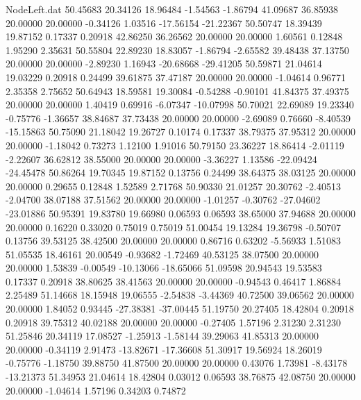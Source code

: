 \begin{filecontents}{NodeLeft.dat}
  50.45683   20.34126   18.96484    -1.54563   -1.86794   41.09687   36.85938   20.00000   20.00000   -0.34126    1.03516  -17.56154  -21.22367
  50.50747   18.39439   19.87152     0.17337    0.20918   42.86250   36.26562   20.00000   20.00000    1.60561    0.12848    1.95290    2.35631
  50.55804   22.89230   18.83057    -1.86794   -2.65582   39.48438   37.13750   20.00000   20.00000   -2.89230    1.16943  -20.68668  -29.41205
  50.59871   21.04614   19.03229     0.20918    0.24499   39.61875   37.47187   20.00000   20.00000   -1.04614    0.96771    2.35358    2.75652
  50.64943   18.59581   19.30084    -0.54288   -0.90101   41.84375   37.49375   20.00000   20.00000    1.40419    0.69916   -6.07347  -10.07998
  50.70021   22.69089   19.23340    -0.75776   -1.36657   38.84687   37.73438   20.00000   20.00000   -2.69089    0.76660   -8.40539  -15.15863
  50.75090   21.18042   19.26727     0.10174    0.17337   38.79375   37.95312   20.00000   20.00000   -1.18042    0.73273    1.12100    1.91016
  50.79150   23.36227   18.86414    -2.01119   -2.22607   36.62812   38.55000   20.00000   20.00000   -3.36227    1.13586  -22.09424  -24.45478
  50.86264   19.70345   19.87152     0.13756    0.24499   38.64375   38.03125   20.00000   20.00000    0.29655    0.12848    1.52589    2.71768
  50.90330   21.01257   20.30762    -2.40513   -2.04700   38.07188   37.51562   20.00000   20.00000   -1.01257   -0.30762  -27.04602  -23.01886
  50.95391   19.83780   19.66980     0.06593    0.06593   38.65000   37.94688   20.00000   20.00000    0.16220    0.33020    0.75019    0.75019
  51.00454   19.13284   19.36798    -0.50707    0.13756   39.53125   38.42500   20.00000   20.00000    0.86716    0.63202   -5.56933    1.51083
  51.05535   18.46161   20.00549    -0.93682   -1.72469   40.53125   38.07500   20.00000   20.00000    1.53839   -0.00549  -10.13066  -18.65066
  51.09598   20.94543   19.53583     0.17337    0.20918   38.80625   38.41563   20.00000   20.00000   -0.94543    0.46417    1.86884    2.25489
  51.14668   18.15948   19.06555    -2.54838   -3.44369   40.72500   39.06562   20.00000   20.00000    1.84052    0.93445  -27.38381  -37.00445
  51.19750   20.27405   18.42804     0.20918    0.20918   39.75312   40.02188   20.00000   20.00000   -0.27405    1.57196    2.31230    2.31230
  51.25846   20.34119   17.08527    -1.25913   -1.58144   39.29063   41.85313   20.00000   20.00000   -0.34119    2.91473  -13.82671  -17.36608
  51.30917   19.56924   18.26019    -0.75776   -1.18750   39.88750   41.87500   20.00000   20.00000    0.43076    1.73981   -8.43178  -13.21373
  51.34953   21.04614   18.42804     0.03012    0.06593   38.76875   42.08750   20.00000   20.00000   -1.04614    1.57196    0.34203    0.74872

\end{filecontents}
